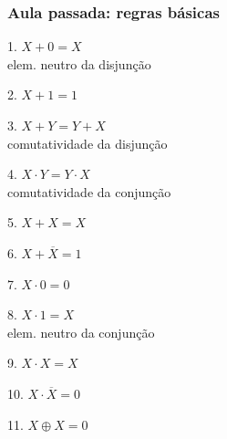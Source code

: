 \documentclass{beamer}
\begin{document}
\begin{frame}
 \frametitle{Aula passada: regras básicas}

\begin{minipage}[t]{0.34\textwidth}
 1. $X + 0 = X$ \\
\footnotesize{elem. neutro da disjunção}
\end{minipage}
%
\begin{minipage}[t]{0.31\textwidth}
 2. $X+1 = 1$
\end{minipage}
%
\begin{minipage}[t]{0.32\textwidth}
 3. $X + Y = Y + X$ \\
 \footnotesize{comutatividade da disjunção}
\end{minipage}

\vspace{12pt}

\begin{minipage}[t]{0.34\textwidth}
 4. $X \cdot Y = Y \cdot X$\\
 \footnotesize{comutatividade da conjunção}
\end{minipage}
%
\begin{minipage}[t]{0.31\textwidth}
 5. $X + X = X$
\end{minipage}
%
\begin{minipage}[t]{0.32\textwidth}
 6. $X + \overline{X} = 1$
\end{minipage}

\vspace{12pt}

\begin{minipage}[t]{0.34\textwidth}
 7. $X \cdot 0 = 0$
\end{minipage}
%
\begin{minipage}[t]{0.31\textwidth}
 8. $X \cdot 1 = X$ \\
 \footnotesize{elem. neutro da conjunção}
\end{minipage}
%
\begin{minipage}[t]{0.32\textwidth}
 9. $X \cdot X = X$
\end{minipage}

\vspace{12pt}

\begin{minipage}[t]{0.34\textwidth}
 10. $X \cdot \overline{X} = 0$
\end{minipage}
%
\begin{minipage}[t]{0.31\textwidth}
 11. $X \oplus X = 0$ 
\end{minipage}


\end{frame}
\end{document}
